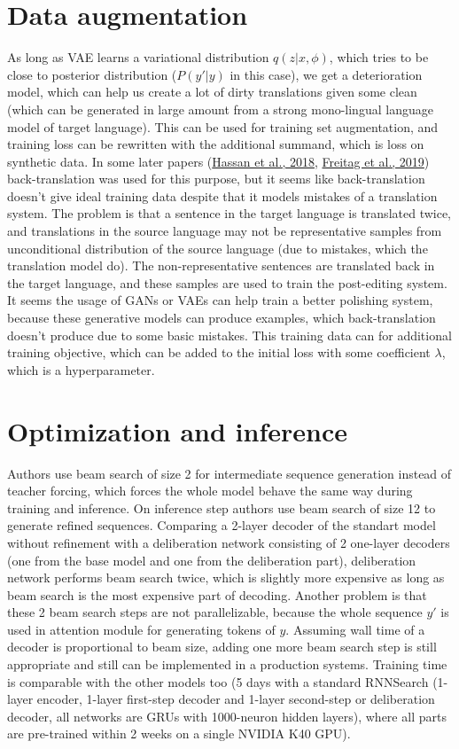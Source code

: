 \documentclass{article}
\begin{document}
\section{Data augmentation}
    As long as VAE learns a variational distribution $q(z | x, \phi)$, which tries to be close to posterior distribution \big($P(y' | y)$ in this case\big), we get a deterioration model, which can help us create a lot of dirty translations given some clean (which can be generated in large amount from a strong mono-lingual language model of target language). This can be used for training set augmentation, and training loss can be rewritten with the additional summand, which is loss on synthetic data. In some later papers (\hyperref[itm:human_parity]{Hassan et al., 2018}, \hyperref[itm:ape]{Freitag et al., 2019}) back-translation was used for this purpose, but it seems like back-translation doesn't give ideal training data despite that it models mistakes of a translation system. The problem is that a sentence in the target language is translated twice, and translations in the source language may not be representative samples from unconditional distribution of the source language (due to mistakes, which the translation model do). The non-representative sentences are translated back in the target language, and these samples are used to train the post-editing system. It seems the usage of GANs or VAEs can help train a better polishing system, because these generative models can produce examples, which back-translation doesn't produce due to some basic mistakes. This training data can for additional training objective, which can be added to the initial loss with some coefficient $\lambda$, which is a hyperparameter.

\section{Optimization and inference}
	Authors use beam search of size 2 for intermediate sequence generation instead of teacher forcing, which forces the whole model behave the same way during training and inference. On inference step authors use beam search of size 12 to generate refined sequences. Comparing a 2-layer decoder of the standart  model without refinement with a deliberation network consisting of 2 one-layer decoders (one from the base model and one from the deliberation part), deliberation network performs beam search twice, which is slightly more expensive as long as beam search is the most expensive part of decoding. Another problem is that these 2 beam search steps are not parallelizable, because the whole sequence $y'$ is used in attention module for generating tokens of $y$. Assuming wall time of a decoder is proportional to beam size, adding one more beam search step is still appropriate and still can be implemented in a production systems. Training time is comparable with the other models too (5 days with a standard RNNSearch (1-layer encoder, 1-layer first-step decoder and 1-layer second-step or deliberation decoder, all networks are GRUs with 1000-neuron hidden layers), where all parts are pre-trained within 2 weeks on a single NVIDIA K40 GPU).
\end{document}
